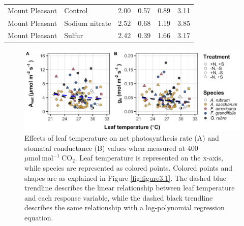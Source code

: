 \begin{table}[]
{\begin{tabular}{p{3cm}p{3.5cm}p{1.5cm}p{1.5cm}p{2.75cm}p{2.75cm}}
        Mount Pleasant & Control          & \multicolumn{1}{r}{2.00}    & \multicolumn{1}{r}{0.57}  & \multicolumn{1}{r}{0.89}          & \multicolumn{1}{r}{3.11}   \\
        Mount Pleasant & Sodium nitrate   & \multicolumn{1}{r}{2.52}    & \multicolumn{1}{r}{0.68}  & \multicolumn{1}{r}{1.19}          & \multicolumn{1}{r}{3.85}   \\
        Mount Pleasant & Sulfur           & \multicolumn{1}{r}{2.42}    & \multicolumn{1}{r}{0.39}  & \multicolumn{1}{r}{1.66}          & \multicolumn{1}{r}{3.17} \\
        \hline        
    \end{tabular}}
    \end{table}
\clearpage

\newpage
    \begin{figure}
        \centering
        \includegraphics[width=\columnwidth]{ch3_NxpH/figs/NxS_figS1_leaftemp.jpg}
        \caption[Effects of leaf temperature on net photosynthesis rate and stomatal conductance values when measured at 400 $\mu \mathrm{mol\ mol^{-1}\ CO_2}$]{Effects of leaf temperature on net photosynthesis rate (A) and stomatal conductance (B) values when measured at 400 $\mu \mathrm{mol\ mol^{-1}\ CO_2}$. Leaf temperature is represented on the x-axis, while species are represented as colored points. Colored points and shapes are as explained in Figure \ref{fig:figure3.1}. The dashed blue trendline describes the linear relationship between leaf temperature and each response variable, while the dashed black trendline describes the same relationship with a log-polynomial regression equation.}
        \label{fig:figure.b1}
    \end{figure}
\clearpage
